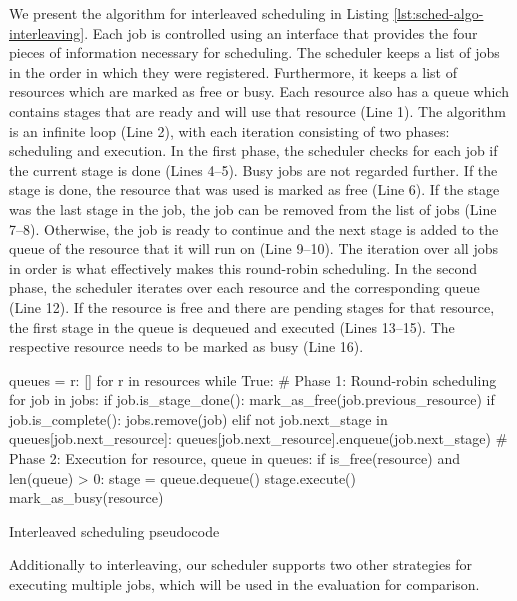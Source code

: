 We present the algorithm for interleaved scheduling in Listing \ref{lst:sched-algo-interleaving}. Each job is controlled using an interface that provides the four pieces of information necessary for scheduling. The scheduler keeps a list of jobs in the order in which they were registered. Furthermore, it keeps a list of resources which are marked as free or busy. Each resource also has a queue which contains stages that are ready and will use that resource (Line 1). The algorithm is an infinite loop (Line 2), with each iteration consisting of two phases: scheduling and execution. In the first phase, the scheduler checks for each job if the current stage is done (Lines 4--5). Busy jobs are not regarded further. If the stage is done, the resource that was used is marked as free (Line 6). If the stage was the last stage in the job, the job can be removed from the list of jobs (Line 7--8). Otherwise, the job is ready to continue and the next stage is added to the queue of the resource that it will run on (Line 9--10). The iteration over all jobs in order is what effectively makes this round-robin scheduling. In the second phase, the scheduler iterates over each resource and the corresponding queue (Line 12). If the resource is free and there are pending stages for that resource, the first stage in the queue is dequeued and executed (Lines 13--15). The respective resource needs to be marked as busy (Line 16).

\begin{listing}
\begin{pythoncode}
queues = {r: [] for r in resources}
while True:
    # Phase 1: Round-robin scheduling
    for job in jobs:
        if job.is_stage_done():
            mark_as_free(job.previous_resource)
            if job.is_complete():
                jobs.remove(job)
            elif not job.next_stage in queues[job.next_resource]:
                queues[job.next_resource].enqueue(job.next_stage)
    # Phase 2: Execution
    for resource, queue in queues:
        if is_free(resource) and len(queue) > 0:
            stage = queue.dequeue()
            stage.execute()
            mark_as_busy(resource)
\end{pythoncode}
\unskip
\caption{Interleaved scheduling pseudocode}
\label{lst:sched-algo-interleaving}
\end{listing}

Additionally to interleaving, our scheduler supports two other strategies for executing multiple jobs, which will be used in the evaluation for comparison.

